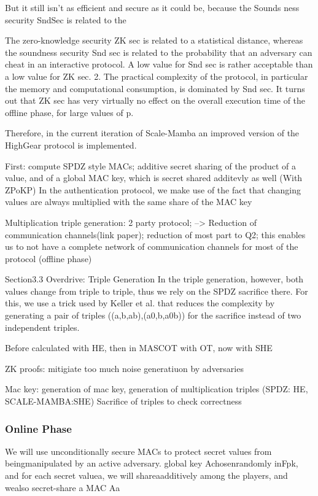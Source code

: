 \documentclass[english,runningheads,a4paper]{llncs}[2018/03/10]
\begin{document}
But it still isn't as efficient and secure as it could be, because the Sounds ness security SndSec is related to the 

The zero-knowledge security ZK sec is related to a statistical distance, whereas the soundness security Snd sec is related to the probability that an adversary can cheat in an interactive protocol. A low value for Snd sec is rather acceptable than a low value for ZK sec. 2. The practical complexity of the protocol, in particular the memory and computational consumption, is dominated by Snd sec. It turns out that ZK sec has very virtually no effect on the overall execution time of the offline phase, for large values of p.

Therefore, in the current iteration of Scale-Mamba an improved version of the HighGear protocol is implemented.



First: compute SPDZ style MACs; additive secret sharing of the product of a value, and of a global MAC key, which is secret shared additevly as well (With ZPoKP)
In the authentication protocol, we make use of the fact that changing values are always multiplied with the same share of the MAC key

Multiplication triple generation: 2 party protocol; --> Reduction of communication channels(link paper); reduction of most part to Q2; this enables us to not have a complete network of communication channels for most of the protocol (offline phase)

Section3.3 Overdrive: Triple Generation
 In the triple generation, however, both values change from triple to triple, thus we rely on the SPDZ sacrifice there. For this, we use a trick used by Keller et al. that reduces the complexity by generating a pair of triples ((a,b,ab),(a0,b,a0b)) for the sacrifice instead of two independent triples. 

Before calculated with HE, then in MASCOT with OT, now with SHE


ZK proofs: mitigiate too much noise generatiuon by adversaries


Mac key: generation of mac key, generation of multiplication triples (SPDZ: HE, SCALE-MAMBA:SHE)
Sacrifice of triples to check correctness


\subsubsection{Online Phase}



We  will  use  unconditionally  secure  MACs  to  protect  secret  values  from  beingmanipulated by an active adversary. 
global key Achosenrandomly inFpk, and for each secret valuea, we will shareaadditively among the players, and wealso secret-share a MAC Aa
\end{document}
